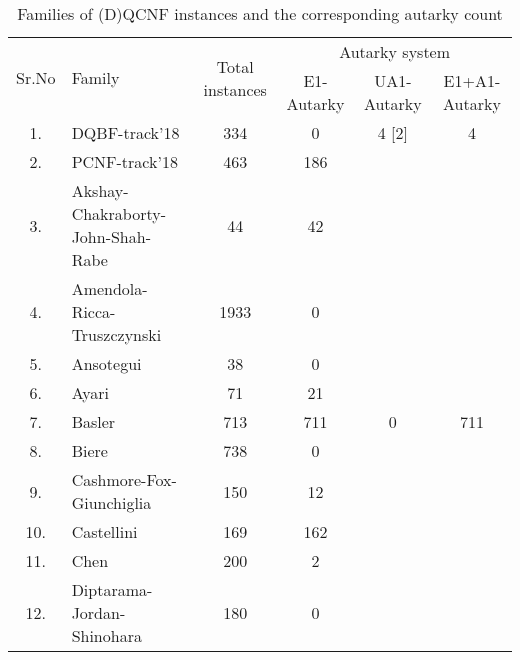 \documentclass[runningheads]{llncs}
\begin{document}
\begin{table}
\caption{Families of (D)QCNF instances and the corresponding autarky count}\label{tab:aut-count}
\begin{tabular}{c|l|c|c|c|c}

\hline
   \multirow{2}{1cm}{Sr.No} &  \multirow{2}{3cm}{Family} &  \multirow{2}{2cm}{Total instances} & \multicolumn{3}{c}{Autarky system} \\
    \cline{4-6}
  & & & E1-Autarky & UA1-Autarky & E1+A1-Autarky \\
    
\hline

1. & DQBF-track'18 &  334 & 0 & 4 [2] & 4 \\ \hline
2. & PCNF-track'18 &  463 & 186 &  &  \\ \hline

3. & Akshay-Chakraborty-John-Shah-Rabe &  44 & 42 &  &  \\ \hline

4. & Amendola-Ricca-Truszczynski & 1933 & 0 &  &  \\ \hline

5. & Ansotegui &  38 & 0 &  &  \\ \hline

6. & Ayari &  71 & 21  &  &  \\ \hline

7. & Basler &  713 & 711 & 0 & 711 \\ \hline

8. & Biere &  738 & 0 &  &  \\ \hline

9. & Cashmore-Fox-Giunchiglia &  150 & 12 &  &  \\ \hline 

10. & Castellini &  169 & 162 &  &  \\ \hline

11. & Chen &  200 & 2 &  &  \\ \hline

12. & Diptarama-Jordan-Shinohara &  180 & 0 &  &  \\ \hline


\end{tabular}
\end{table}
\end{document}
